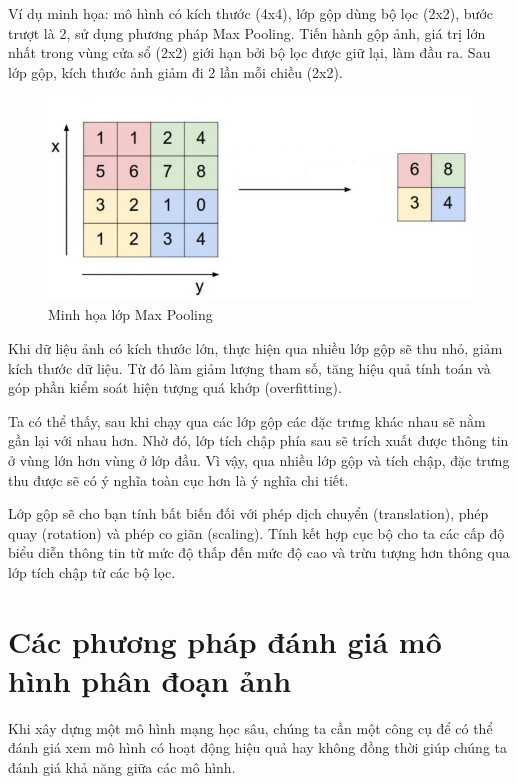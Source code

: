 Ví dụ minh họa: mô hình có kích thước (4x4), lớp gộp dùng bộ lọc (2x2), bước trượt là 2, sử dụng phương pháp Max Pooling. Tiến hành gộp ảnh, giá trị lớn nhất trong vùng cửa sổ (2x2) giới hạn bởi bộ lọc được giữ lại, làm đầu ra. Sau lớp gộp, kích thước ảnh giảm đi 2 lần mỗi chiều (2x2). 

\begin{figure}[H]
	\begin{center}
		\includegraphics[width=12cm]{images/blood/maxpool.jpg}
		\caption{Minh họa lớp Max Pooling \cite{CNN}}
	\end{center}
\end{figure}

Khi dữ liệu ảnh có kích thước lớn, thực hiện qua nhiều lớp gộp sẽ thu nhỏ, giảm kích thước dữ liệu. Từ đó làm giảm lượng tham số, tăng hiệu quả tính toán và góp phần kiểm soát hiện tượng quá khớp (overfitting). \par

Ta có thể thấy, sau khi chạy qua các lớp gộp các đặc trưng khác nhau sẽ nằm gần lại với nhau hơn. Nhờ đó, lớp tích chập phía sau sẽ trích xuất được thông tin ở vùng lớn hơn vùng ở lớp đầu. Vì vậy, qua nhiều lớp gộp và tích chập, đặc trưng thu được sẽ có ý nghĩa toàn cục hơn là ý nghĩa chi tiết. \par

Lớp gộp sẽ cho bạn tính bất biến đối với phép dịch chuyển (translation), phép quay (rotation) và phép co giãn (scaling). Tính kết hợp cục bộ cho ta các cấp độ biểu diễn thông tin từ mức độ thấp đến mức độ cao và trừu tượng hơn thông qua lớp tích chập từ các bộ lọc.

\newpage
\section{Các phương pháp đánh giá mô hình phân đoạn ảnh}\label{evaluation-methods}
Khi xây dựng một mô hình mạng học sâu, chúng ta cần một công cụ để có thể đánh giá xem mô hình có hoạt động hiệu quả hay không đồng thời giúp chúng ta đánh giá khả năng giữa các mô hình. \par

